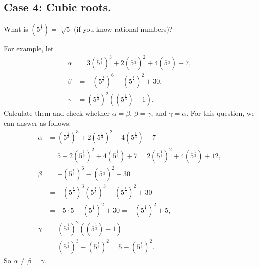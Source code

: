 \subsection{Case 4: Cubic roots.}
What is $\left(5^{\frac{1}{3}}\right)=\sqrt[3]{5}$
(if you know rational numbers)?

For example, let
\begin{align*}
  \alpha &= 3\left(5^{\frac{1}{3}}\right)^3+2\left(5^{\frac{1}{3}}\right)^2+4 \left(5^{\frac{1}{3}}\right)+ 7,\\
  \beta &= -\left(5^{\frac{1}{3}}\right)^6 -\left(5^{\frac{1}{3}}\right)^2+30,\\
  \gamma &= \left(5^{\frac{1}{3}}\right)^2(\left(5^{\frac{1}{3}}\right) - 1).
\end{align*}
Calculate them and check whether $\alpha=\beta$, $\beta=\gamma$,
and $\gamma=\alpha$.
For this question, we can answer as follows:
\begin{align*}
  \alpha &= \left(5^{\frac{1}{3}}\right)^3+2\left(5^{\frac{1}{3}}\right)^2+4 \left(5^{\frac{1}{3}}\right)+ 7\\
  &=5+2\left(5^{\frac{1}{3}}\right)^2+4 \left(5^{\frac{1}{3}}\right)+ 7
  =2\left(5^{\frac{1}{3}}\right)^2+4 \left(5^{\frac{1}{3}}\right)+ 12,\\
  \beta &= -\left(5^{\frac{1}{3}}\right)^6 -\left(5^{\frac{1}{3}}\right)^2+30\\
   &= -\left(5^{\frac{1}{3}}\right)^3\left(5^{\frac{1}{3}}\right)^3 -\left(5^{\frac{1}{3}}\right)^2+30\\
   &= -5\cdot 5 -\left(5^{\frac{1}{3}}\right)^2+30
   = -\left(5^{\frac{1}{3}}\right)^2+5,\\
  \gamma &= \left(5^{\frac{1}{3}}\right)^2(\left(5^{\frac{1}{3}}\right) - 1)\\
  &= \left(5^{\frac{1}{3}}\right)^3 - \left(5^{\frac{1}{3}}\right)^2
  =5 - \left(5^{\frac{1}{3}}\right)^2.
\end{align*}
So $\alpha\neq \beta=\gamma$.

